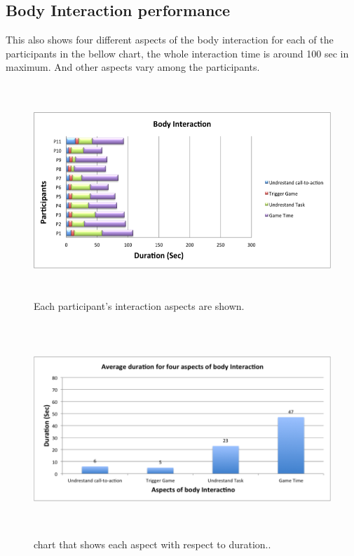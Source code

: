 \subsection{Body Interaction performance}
This also shows four different aspects of the body interaction for each of the participants in the bellow chart, the whole interaction time is around 100 sec in maximum. And other aspects vary among the participants.

\begin{figure}[H]
\centering
\includegraphics[width=12cm,height=8cm]{Figures/6/body_performance}%
 \caption{Each participant's interaction aspects are shown. }%
 \label{fig:body_performance}%
\end{figure}

\begin{figure}[H]
\centering
\includegraphics[width=12cm,height=8cm]{Figures/6/body_average}%
 \caption{chart that shows each aspect with respect to duration.. }%
 \label{fig:body_average}%
\end{figure}

